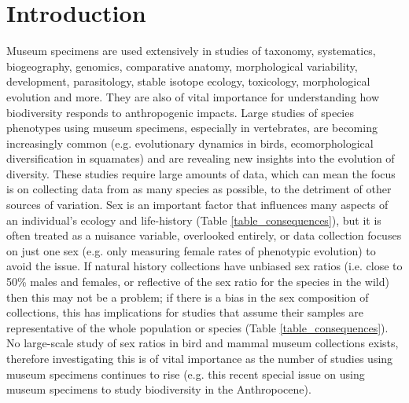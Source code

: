 \documentclass[a4paper, 12pt]{article}
\begin{document}
\section{Introduction}\label{main}
Museum specimens are used extensively in studies of taxonomy, systematics, biogeography, genomics, comparative anatomy, morphological variability, development, parasitology, stable isotope ecology, toxicology, morphological evolution and more\cite{lister2011natural,pyke2010biological,mclean2015natural}. 
They are also of vital importance for understanding how biodiversity responds to anthropogenic impacts\cite{meineke2018biological}. 
Large studies of species phenotypes using museum specimens, especially in vertebrates, are becoming increasingly common (e.g. evolutionary dynamics in birds\cite{cooney2017mega}, ecomorphological diversification in squamates\cite{watanabe2019}) and are revealing new insights into the evolution of diversity. 
These studies require large amounts of data, which can mean the focus is on collecting data from as many species as possible, to the detriment of other sources of variation. 
Sex is an important factor that influences many aspects of an individual's ecology and life-history (Table \ref{table_consequences}), but it is often treated as a nuisance variable, overlooked entirely, or data collection focuses on just one sex (e.g. only measuring female rates of phenotypic evolution\cite{cooper2009factors}) to avoid the issue. 
If natural history collections have unbiased sex ratios (i.e. close to 50\% males and females, or reflective of the sex ratio for the species in the wild\cite{karlin1986theoretical}) then this may not be a problem; if there is a bias in the sex composition of collections, this has implications for studies that assume their samples are representative of the whole population or species (Table \ref{table_consequences}). 
No large-scale study of sex ratios in bird and mammal museum collections exists, therefore investigating this is of vital importance as the number of studies using museum specimens continues to rise (e.g. this recent special issue on using museum specimens to study biodiversity in the Anthropocene\cite{meineke2018biological}).
\end{document}
